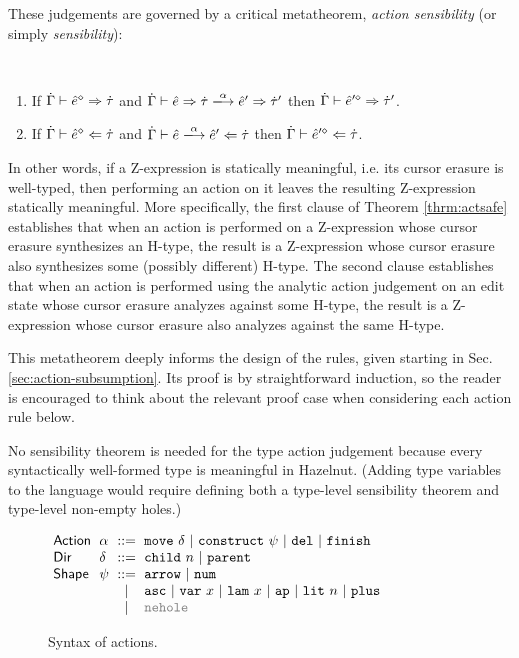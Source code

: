 These judgements are governed by a critical 
metatheorem, \emph{action sensibility} (or simply \emph{sensibility}): 
\begin{theorem}
  \label{thrm:actsafe} ~
  \begin{enumerate}[itemsep=0px,partopsep=0px,topsep=0px]
  \item If $\dot{\Gamma} \vdash \hat{e}^{\diamond} \Rightarrow \dot{\tau}$ and
    $\performSyn{\hGamma}{\zexp}{\htau}{\alpha}{\zexp'}{\htau'}$ then
    $\dot{\Gamma} \vdash \hat{e}'^{\diamond} \Rightarrow \dot{\tau}'$.
  \item If $\dot{\Gamma} \vdash \hat{e}^{\diamond} \Leftarrow \dot{\tau}$ and
    $\performAna{\hGamma}{\zexp}{\htau}{\alpha}{\zexp'}$ then
    $\dot{\Gamma} \vdash \hat{e}'^{\diamond} \Leftarrow \dot{\tau}$.
  \end{enumerate}
\end{theorem}
\noindent In other words, if a Z-expression is
statically meaningful, i.e. its cursor erasure is well-typed, then
performing an action on it leaves the resulting Z-expression statically
meaningful. More specifically, the first clause of Theorem \ref{thrm:actsafe}
establishes that when an action is performed on a Z-expression whose cursor
erasure synthesizes an H-type, the result is a Z-expression whose cursor
erasure also synthesizes some (possibly different) H-type. The second
clause establishes that when an action is performed using the analytic
action judgement on an edit state whose cursor erasure analyzes against
some H-type, the result is a Z-expression whose cursor erasure also
analyzes against the same H-type.

This metatheorem deeply informs the design
of the rules, given starting in Sec. \ref{sec:action-subsumption}. Its
proof is by straightforward induction, so the
reader is encouraged to think about the relevant proof case when considering each action rule below.

No sensibility theorem is needed for the type action judgement because every syntactically well-formed type is meaningful in Hazelnut. (Adding type variables to the language would require defining both a type-level sensibility theorem and 
type-level non-empty holes.)
\begin{figure}[t]
\hspace{-3px}$\arraycolsep=3pt\begin{array}{llcllll}
\mathsf{Action} & \alpha & ::= &
  \aMove{\delta} ~\vert~
  \aConstruct{\psi} ~\vert~
  \aDel ~\vert~
  \aFinish\\
\mathsf{Dir} & \delta & ::= &
  \dChildnm{n} ~\vert~
  \dParent\\
\mathsf{Shape} & \psi & ::= &
  \farr ~\vert~
  \fnum \\
& & \vert &
  \fasc ~\vert~
  \fvar{x} ~\vert~
  \flam{x} ~\vert~
  \fap ~\vert~
  \fnumlit{n} ~\vert~
  \fplus\\
& & \vert &
  {\color{gray}\fnehole}
\end{array}$
\caption{Syntax of actions.}
\label{fig:action-syntax}
\end{figure}

